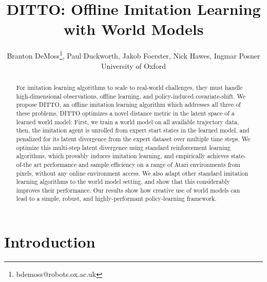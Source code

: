 \documentclass[10pt]{article} %
\title{DITTO: Offline Imitation Learning with World Models}
\author{Branton DeMoss\thanks{bdemoss@robots.ox.ac.uk}, Paul Duckworth, Jakob Foerster, Nick Hawes, Ingmar Posner \\
  University of Oxford\\
}
\theoremstyle{plain}
\theoremstyle{definition}
\theoremstyle{remark}
\begin{document}
\maketitle

\begin{abstract}
For imitation learning algorithms to scale to real-world challenges, they must handle high-dimensional observations, offline learning, and policy-induced covariate-shift. We propose DITTO, an offline imitation learning algorithm which addresses all three of these problems. DITTO optimizes a novel distance metric in the latent space of a learned world model: First, we train a world model on all available trajectory data, then, the imitation agent is unrolled from expert start states in the learned model, and penalized for its latent divergence from the expert dataset over multiple time steps. We optimize this multi-step latent divergence using standard reinforcement learning algorithms, which provably induces imitation learning, and empirically achieves state-of-the art performance and sample efficiency on a range of Atari environments from pixels, without any online environment access. We also adapt other standard imitation learning algorithms to the world model setting, and show that this considerably improves their performance. Our results show how creative use of world models can lead to a simple, robust, and highly-performant policy-learning framework.
\end{abstract}

\section{Introduction}\label{intro}
\end{document}
